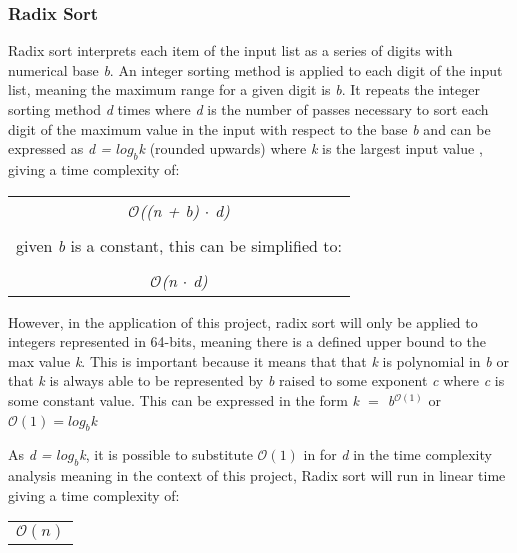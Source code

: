 \documentclass[12pt]{article}
\begin{document}
	\subsubsection{Radix Sort}
	Radix sort interprets each item of the input list as a series of digits with numerical base \textit{b}. An integer sorting method is applied to each digit of the input list, meaning the maximum range for a given digit is \textit{b}. It repeats the integer sorting method \textit{d} times where \textit{d} is the number of passes necessary to sort each digit of the maximum value in the input with respect to the base \textit{b} and can be expressed as \textit{d = $log_b$k} (rounded upwards) where \textit{k} is the largest input value , giving a time complexity of:
	\begin{table}[!h]
		\begin{center}
			\begin{tabular}{c}

	 $\mathcal{O}$\textit{((n + b) $\cdot$ d)}
 \\ \\
	given \textit{b} is a constant, this can be simplified to:
\\	\\
	$\mathcal{O}$\textit{(n $\cdot$ d)} 
			\end{tabular}
				
			\end{center}
		\end{table}
			
	However, in the application of this project, radix sort will only be applied to integers represented in 64-bits, meaning there is a defined upper bound to the max value \textit{k}. This is important because it means that that \textit{k} is polynomial in \textit{b} or that \textit{k} is always able to be represented by \textit{b} raised to some exponent \textit{c} where \textit{c} is some constant value. This can be expressed in the form \textit{k $=$ b$^{\mathcal{O}(1)}$} or \textit{$\mathcal{O}(1) = log_b$k}
	\par
	As \textit{d = $log_b$k}, it is possible to substitute $\mathcal{O}(1)$ in for \textit{d} in the time complexity analysis meaning in the context of this project, Radix sort will run in linear time giving a time complexity of:
	\begin{table}[!h]
		\begin{center}
			\begin{tabular}{c}

				$\mathcal{O}(n)$
			\end{tabular}
				
			\end{center}
		\end{table}
	\pagebreak
\end{document}
